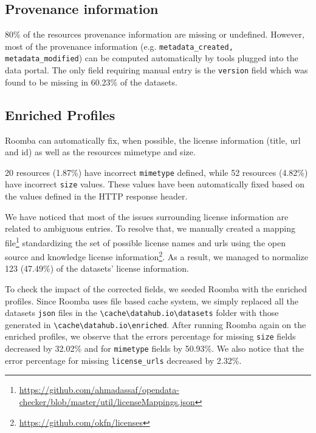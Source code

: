 \documentclass[runningheads,a4paper]{../../Util/LaTEX/llncs}
\begin{document}
\subsection{Provenance information}
80\% of the resources provenance information are missing or undefined. However, most of the provenance information (e.g. \texttt{metadata\_created, metadata\_modified}) can be computed automatically by tools plugged into the data portal. The only field requiring manual entry is the \texttt{version} field which was found to be missing in 60.23\% of the datasets.

\subsection{Enriched Profiles}
Roomba can automatically fix, when possible, the license information (title, url and id) as well as the resources mimetype and size.

20 resources (1.87\%) have incorrect \texttt{mimetype} defined, while 52 resources (4.82\%) have incorrect \texttt{size} values. These values have been automatically fixed based on the values defined in the HTTP response header.

We have noticed that most of the issues surrounding license information are related to ambiguous entries. To resolve that, we manually created a mapping file\footnote{\url{https://github.com/ahmadassaf/opendata-checker/blob/master/util/licenseMappings.json}} standardizing the set of possible license names and urls using the open source and knowledge license information\footnote{\url{https://github.com/okfn/licenses}}. As a result, we managed to normalize 123 (47.49\%) of the datasets' license information.

To check the impact of the corrected fields, we seeded Roomba with the enriched profiles. Since Roomba uses file based cache system, we simply replaced all the datasets \texttt{json} files in the \texttt{\textbackslash cache\textbackslash datahub.io\textbackslash datasets} folder with those generated in \texttt{\textbackslash cache\textbackslash datahub.io\textbackslash enriched}. After running Roomba again on the enriched profiles, we observe that the errors percentage for missing \texttt{size} fields decreased by 32.02\% and for \texttt{mimetype} fields by 50.93\%. We also notice that the error percentage for missing \texttt{license\_urls} decreased by 2.32\%.

\end{document}
